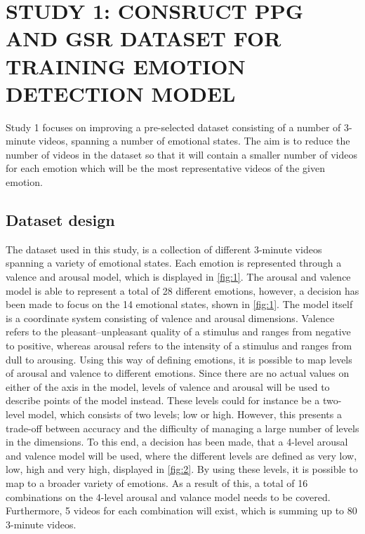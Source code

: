 



\section{STUDY 1: CONSRUCT PPG AND GSR DATASET FOR TRAINING EMOTION DETECTION MODEL}
Study 1 focuses on improving a pre-selected dataset consisting of a number of 3-minute videos, spanning a number of emotional states. The aim is to reduce the number of videos in the dataset so that it will contain a smaller number of videos for each emotion which will be the most representative videos of the given emotion.

\subsection{Dataset design}
The dataset used in this study, is a collection of different 3-minute videos spanning a variety of emotional states. Each emotion is represented through a valence and arousal model, which is displayed in \cref{fig:1}. The arousal and valence model is able to represent a total of 28 different emotions, however, a decision has been made to focus on the 14 emotional states, shown in \cref{fig:1}. The model itself is a coordinate system consisting of valence and arousal dimensions. Valence refers to the pleasant–unpleasant quality of a stimulus and ranges from negative to positive, whereas arousal refers to the intensity of a stimulus and ranges from dull to arousing. Using this way of defining emotions, it is possible to map levels of arousal and valence to different emotions. Since there are no actual values on either of the axis in the model, levels of valence and arousal will be used to describe points of the model instead. These levels could for instance be a two-level model, which consists of two levels; low or high. However, this presents a trade-off between accuracy and the difficulty of managing a large number of levels in the dimensions. To this end, a decision has been made, that a 4-level arousal and valence model will be used, where the different levels are defined as very low, low, high and very high, displayed in \cref{fig:2}. By using these levels, it is possible to map to a broader variety of emotions. As a result of this, a total of 16 combinations on the 4-level arousal and valance model needs to be covered. Furthermore, 5 videos for each combination will exist, which is summing up to 80 3-minute videos.

